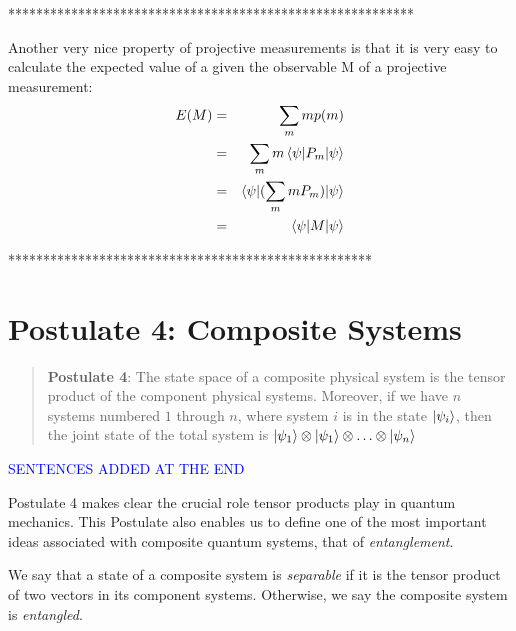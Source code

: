 {%





**********************************************************


Another very nice property of projective measurements is that it is very easy to calculate the expected value of a given the observable M of a projective measurement:
\begin{eqnarray}
E(M)&=&\sum_m mp(m)\\
&=&\sum_m m \braket{\psi|P_m|\psi}\\
&=&\braket{\psi|(\sum_m mP_m)|\psi}\\
&=&\braket{\psi|M|\psi}
\end{eqnarray}

****************************************************
\pagebreak
\section{Postulate 4: Composite Systems} \label{section: composite systems}
\begin{quote}
    \textbf{Postulate 4}:  The state space of a composite physical system is the tensor product of the component physical systems. Moreover, if we have $n$ systems numbered $1$ through $n$, where system $i$ is in the state $\ket{\psi_i}$, then the joint state of the total system is $\ket{\psi_1} \otimes \ket{\psi_1} \otimes \hdots \otimes \ket{\psi_n}$
\end{quote}

\textcolor{blue}{SENTENCES ADDED AT THE END}

Postulate 4 makes clear the crucial role tensor products play in quantum mechanics.  This Postulate also enables us to define one of the most important ideas associated with composite quantum systems, that of \textit{entanglement}. 


\begin{definition}\label{definition: entanglement with state vector}
We say that a state of a composite system is \textit{separable} if it is the tensor product of two vectors in its component systems. Otherwise, we say the composite system is \textit{entangled}.
\end{definition}


}
